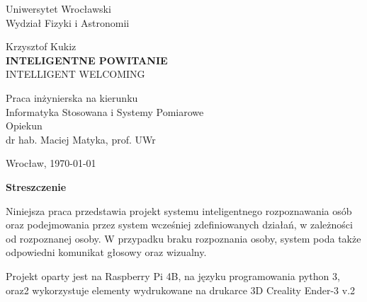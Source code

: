 \documentclass[a4paper,12pt,reqno]{article}
\begin{document}


\begin{center}

\thispagestyle{empty}

\Large 
Uniwersytet Wrocławski\\
Wydział Fizyki i Astronomii\\
\vspace{0.8cm}
\vspace{1.8cm}

\Large Krzysztof Kukiz \\
\vspace{3.2cm}
\Large \textbf{INTELIGENTNE POWITANIE} \\
\vspace{1.5cm}
INTELLIGENT WELCOMING
\end{center}
\vspace{3.7cm}
\begin{flushright}
\large{Praca inżynierska na kierunku \\Informatyka Stosowana i Systemy Pomiarowe \\}
\vspace{0.5cm}
\large{ Opiekun \\ dr hab. Maciej Matyka, prof. UWr}
\end{flushright}
\vspace{2.2cm}

\begin{center}
\large Wrocław, \today
\end{center}

\newpage

\tableofcontents

\newpage

%
%
\begin{flushleft}
\Large \textbf{Streszczenie}
\end{flushleft}
\vspace{1cm}

Niniejsza praca przedstawia projekt systemu inteligentnego rozpoznawania osób oraz podejmowania przez system wcześniej zdefiniowanych działań, w zależności od rozpoznanej osoby. W przypadku braku rozpoznania osoby, system poda także odpowiedni komunikat głosowy oraz wizualny. 

Projekt oparty jest na Raspberry Pi 4B, na języku programowania python 3, oraz2 wykorzystuje elementy wydrukowane na drukarce 3D Creality Ender-3 v.2
\end{document}
